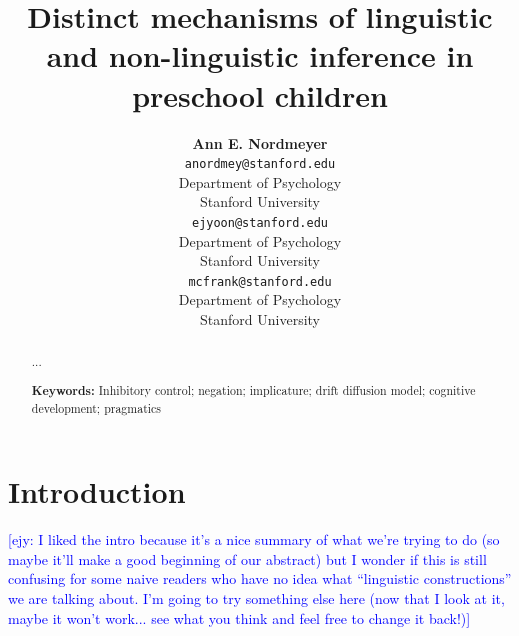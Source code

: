 \documentclass[10pt,letterpaper]{article}
\title{Distinct mechanisms of linguistic and non-linguistic inference in preschool children}
\author{{\large \bf Ann E. Nordmeyer} \\
  \texttt{anordmey@stanford.edu} \\
  Department of Psychology \\
  Stanford University
  \And {\large \bf Erica J. Yoon} \\
  \texttt{ejyoon@stanford.edu} \\
  Department of Psychology \\
  Stanford University
  \And {\large \bf Michael C. Frank} \\
  \texttt{mcfrank@stanford.edu} \\
  Department of Psychology \\
  Stanford University}
\newcommand{\ejy}[1]{\textcolor{Blue}{[ejy: #1]}}
\begin{document}
\maketitle


\begin{abstract}

...

\textbf{Keywords:} 
Inhibitory control; negation; implicature; drift diffusion model; cognitive development; pragmatics

\end{abstract}


\section{Introduction}
\ejy{I liked the intro because it's a nice summary of what we're trying to do (so maybe it'll make a good beginning of our abstract) but I wonder if this is still confusing for some naive readers who have no idea what ``linguistic constructions'' we are talking about. I'm going to try something else here (now that I look at it, maybe it won't work... see what you think and feel free to change it back!)}
\end{document}
